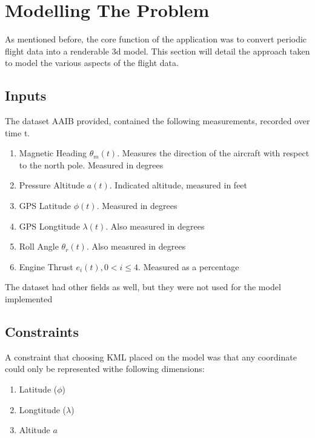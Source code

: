 
\chapter{Modelling The Problem} %

\label{ch:model} %

As mentioned before, the core function of the application was to convert periodic flight data into a
renderable 3d model. This section will detail the approach taken to model the various aspects of the flight data.\\


\section{Inputs}

The dataset AAIB provided, contained the following measurements, recorded over time t.
\begin{enumerate}
  \item Magnetic Heading $\theta_{m}(t)$. Measures the direction of the aircraft with respect to the north pole. Measured in degrees
  \item Pressure Altitude $a(t)$. Indicated altitude, measured in feet
  \item GPS Latitude $\phi(t)$. Measured in degrees
  \item GPS Longtitude $\lambda(t)$. Also measured in degrees
  \item Roll Angle $\theta_{r}(t)$. Also measured in degrees
  \item Engine Thrust $e_{i}(t), 0 < i \leq 4$. Measured as a percentage
\end{enumerate}

The dataset had other fields as well, but they were not used for the model implemented

\section{Constraints}

A constraint that choosing KML placed on the model was that any coordinate could only be represented withe following dimensions\citep{google:kml}:
\begin{enumerate}
\item Latitude ($\phi$)
\item Longtitude ($\lambda$)
\item Altitude $a$
\end{enumerate}

